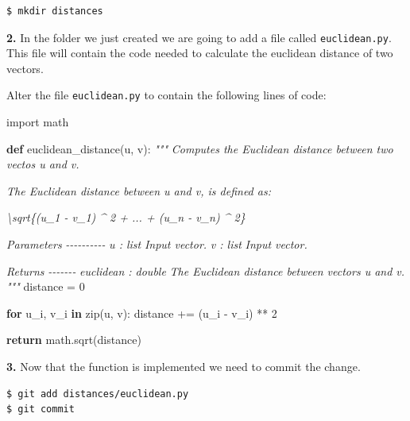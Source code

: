 \documentclass[11pt]{article}
\newenvironment{Shaded}{}{}
\newcommand{\KeywordTok}[1]{\textcolor[rgb]{0.00,0.44,0.13}{\textbf{{#1}}}}
\newcommand{\DecValTok}[1]{\textcolor[rgb]{0.25,0.63,0.44}{{#1}}}
\newcommand{\CommentTok}[1]{\textcolor[rgb]{0.38,0.63,0.69}{\textit{{#1}}}}
\newcommand{\NormalTok}[1]{{#1}}
\newcommand{\ImportTok}[1]{{#1}}
\newcommand{\ControlFlowTok}[1]{\textcolor[rgb]{0.00,0.44,0.13}{\textbf{{#1}}}}
\newcommand{\OperatorTok}[1]{\textcolor[rgb]{0.40,0.40,0.40}{{#1}}}
\newcommand{\BuiltInTok}[1]{{#1}}
\begin{document}
\begin{verbatim}
$ mkdir distances
\end{verbatim}

\textbf{2.} In the folder we just created we are going to add a file
called \texttt{euclidean.py}. This file will contain the code needed to
calculate the euclidean distance of two vectors.

Alter the file \texttt{euclidean.py} to contain the following lines of
code:

\begin{Shaded}
\begin{Highlighting}[]
\ImportTok{import}\NormalTok{ math }

\KeywordTok{def}\NormalTok{ euclidean\_distance(u, v):}
    \CommentTok{"""}
\CommentTok{    Computes the Euclidean distance between two vectos \textasciigrave{}u\textasciigrave{} and \textasciigrave{}v\textasciigrave{}.}

\CommentTok{    The Euclidean distance between \textasciigrave{}u\textasciigrave{} and \textasciigrave{}v\textasciigrave{}, is defined as:}

\CommentTok{    \textbackslash{}sqrt\{(u\_1 {-} v\_1) \^{} 2 + ... + (u\_n {-} v\_n) \^{} 2\}}

\CommentTok{    Parameters}
\CommentTok{    {-}{-}{-}{-}{-}{-}{-}{-}{-}{-}}
\CommentTok{    u : list}
\CommentTok{        Input vector.}
\CommentTok{    v : list}
\CommentTok{        Input vector.}

\CommentTok{    Returns}
\CommentTok{    {-}{-}{-}{-}{-}{-}{-}}
\CommentTok{    euclidean : double}
\CommentTok{        The Euclidean distance between vectors \textasciigrave{}u\textasciigrave{} and \textasciigrave{}v\textasciigrave{}.}
\CommentTok{    """}
\NormalTok{    distance }\OperatorTok{=} \DecValTok{0}
    
    \ControlFlowTok{for}\NormalTok{ u\_i, v\_i }\KeywordTok{in} \BuiltInTok{zip}\NormalTok{(u, v):}
\NormalTok{        distance }\OperatorTok{+=}\NormalTok{ (u\_i }\OperatorTok{{-}}\NormalTok{ v\_i) }\OperatorTok{**} \DecValTok{2}
        
    \ControlFlowTok{return}\NormalTok{ math.sqrt(distance)}
\end{Highlighting}
\end{Shaded}

\textbf{3.} Now that the function is implemented we need to commit the
change.

\begin{verbatim}
$ git add distances/euclidean.py
$ git commit
\end{verbatim}
\end{document}

